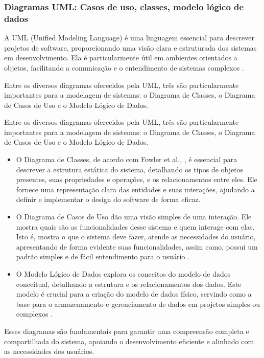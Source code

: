 \subsubsection{Diagramas UML: Casos de uso, classes, modelo lógico de dados}
A UML (Unified Modeling Language) é uma linguagem essencial para descrever projetos de software, proporcionando uma visão clara e estruturada dos sistemas em desenvolvimento. Ela é particularmente útil em ambientes orientados a objetos, facilitando a comunicação e o entendimento de sistemas complexos \cite{fowler2005}.

Entre os diversos diagramas oferecidos pela UML, três são particularmente importantes para a modelagem de sistemas: o Diagrama de Classes, o Diagrama de Casos de Uso e o Modelo Lógico de Dados.

Entre os diversos diagramas oferecidos pela UML, três são particularmente importantes para a modelagem de sistemas: o Diagrama de Classes, o Diagrama de Casos de Uso e o Modelo Lógico de Dados.

\begin{itemize}
    \item O Diagrama de Classes, de acordo com Fowler et al., \cite{fowler2005}, é essencial para descrever a estrutura estática do sistema, detalhando os tipos de objetos presentes, suas propriedades e operações, e os relacionamentos entre eles. Ele fornece uma representação clara das entidades e suas interações, ajudando a definir e implementar o design do software de forma eficaz.
    \item  O Diagrama de Casos de Uso dão uma visão simples de uma interação. Ele  mostra quais são as funcionalidades desse sistema e quem interage com elas. Isto é, mostra o que o sistema deve fazer, atende as necessidades do usuário, apresentando de forma evidente suas funcionalidades, assim como, possui um padrão simples e de fácil entendimento para o usuário \cite{sommerville2011}.
    \item O Modelo Lógico de Dados explora os conceitos do modelo de dados conceitual, detalhando a estrutura e os relacionamentos dos dados. Este modelo é crucial para a criação do modelo de dados físico, servindo como a base para o armazenamento e gerenciamento de dados em projetos simples ou complexos \cite{cougo1997}.
\end{itemize}

Esses diagramas são fundamentais para garantir uma compreensão completa e compartilhada do sistema, apoiando o desenvolvimento eficiente e alinhado com as necessidades dos usuários.
